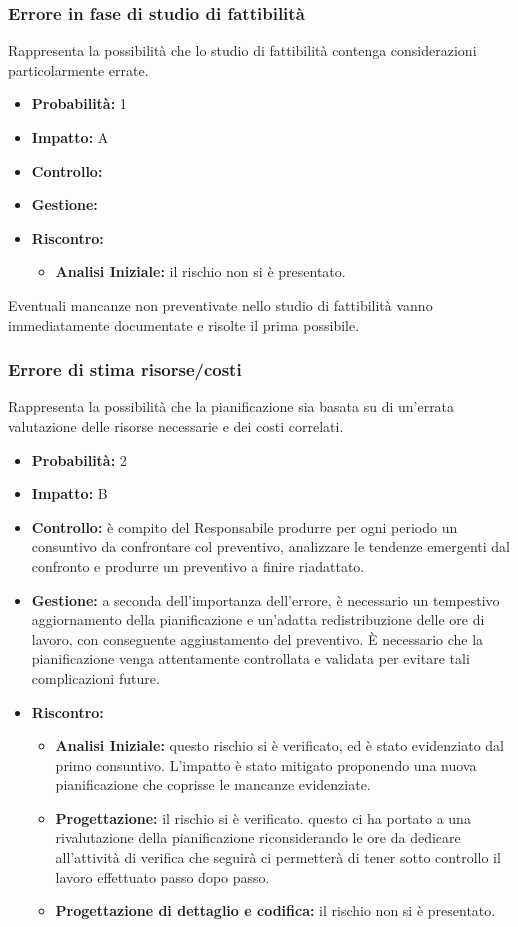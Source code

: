 \documentclass[a4paper,11pt]{article}
\begin{document}
		\subsubsection{Errore in fase di studio di fattibilità}
		Rappresenta la possibilità che lo studio di fattibilità contenga considerazioni particolarmente errate.
		\begin{itemize}
		\item \textbf{Probabilità:} 1
		\item \textbf{Impatto:} A
		\item \textbf{Controllo:}
		\item \textbf{Gestione:}
		\item \textbf{Riscontro:}
			\begin{itemize}
				\item\textbf{Analisi Iniziale:} il rischio non si è presentato.
			\end{itemize}
		\end{itemize}
		Eventuali mancanze non preventivate nello studio di fattibilità vanno immediatamente documentate e risolte il prima possibile.
		\subsubsection{Errore di stima risorse/costi}
		Rappresenta la possibilità che la pianificazione sia basata su di un'errata valutazione delle risorse necessarie e dei costi correlati.
		\begin{itemize}
		\item \textbf{Probabilità:} 2
		\item \textbf{Impatto:} B
		\item \textbf{Controllo:} è compito del Responsabile produrre per ogni periodo un consuntivo da confrontare col preventivo, analizzare le tendenze emergenti dal confronto e produrre un preventivo a finire riadattato. 
		\item \textbf{Gestione:} a seconda dell'importanza dell'errore, è necessario un tempestivo aggiornamento della pianificazione e un'adatta redistribuzione delle ore di lavoro, con conseguente aggiustamento del preventivo. È necessario che la pianificazione venga attentamente controllata e validata per evitare tali complicazioni future.
		\item \textbf{Riscontro:}
			\begin{itemize}
				\item\textbf{Analisi Iniziale:} questo rischio si è verificato, ed è stato evidenziato dal primo consuntivo. L'impatto è stato mitigato proponendo una nuova pianificazione che coprisse le mancanze evidenziate.
				\item\textbf{Progettazione:} il rischio si è verificato. questo ci ha portato a una rivalutazione della pianificazione riconsiderando le ore da dedicare all'attività di verifica che seguirà ci permetterà di tener sotto controllo il lavoro effettuato passo dopo passo.
				\item\textbf{Progettazione di dettaglio e codifica:} il rischio non si è presentato.
			\end{itemize}
		\end{itemize}
\end{document}
